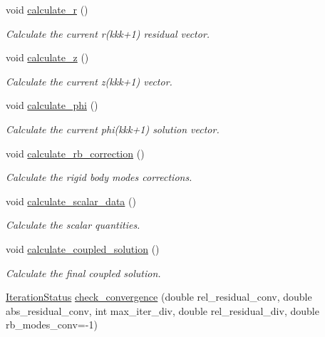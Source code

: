 \begin{DoxyCompactItemize}
void \hyperlink{classcarl_1_1_f_e_t_i___operations_a96e3e218306003defbd201395e2f20f4}{calculate\+\_\+r} ()
\begin{DoxyCompactList}\small\item\em Calculate the current {\ttfamily r(kkk+1)} residual vector. \end{DoxyCompactList}\item 
void \hyperlink{classcarl_1_1_f_e_t_i___operations_afba2f2384902338914fbec991415b506}{calculate\+\_\+z} ()
\begin{DoxyCompactList}\small\item\em Calculate the current {\ttfamily z(kkk+1)} vector. \end{DoxyCompactList}\item 
void \hyperlink{classcarl_1_1_f_e_t_i___operations_a5fc2ed24ce08b9394c78a80bf218a010}{calculate\+\_\+phi} ()
\begin{DoxyCompactList}\small\item\em Calculate the current {\ttfamily phi(kkk+1)} solution vector. \end{DoxyCompactList}\item 
void \hyperlink{classcarl_1_1_f_e_t_i___operations_abb5c3844bf76169f8ded17fb797fac63}{calculate\+\_\+rb\+\_\+correction} ()
\begin{DoxyCompactList}\small\item\em Calculate the rigid body modes corrections. \end{DoxyCompactList}\item 
void \hyperlink{classcarl_1_1_f_e_t_i___operations_a0ac533eb498e4b33f8fcf066e18e67ec}{calculate\+\_\+scalar\+\_\+data} ()
\begin{DoxyCompactList}\small\item\em Calculate the scalar quantities. \end{DoxyCompactList}\item 
void \hyperlink{classcarl_1_1_f_e_t_i___operations_a57cda9fa06a9011093fa59bd6c4429cf}{calculate\+\_\+coupled\+\_\+solution} ()
\begin{DoxyCompactList}\small\item\em Calculate the final coupled solution. \end{DoxyCompactList}\item 
\hyperlink{namespacecarl_aa16a7148474e795cb6fea24b9159dccb}{Iteration\+Status} \hyperlink{classcarl_1_1_f_e_t_i___operations_ad15837b7ae519dc08d9908688441f024}{check\+\_\+convergence} (double rel\+\_\+residual\+\_\+conv, double abs\+\_\+residual\+\_\+conv, int max\+\_\+iter\+\_\+div, double rel\+\_\+residual\+\_\+div, double rb\+\_\+modes\+\_\+conv=-\/1)

\end{DoxyCompactItemize}
